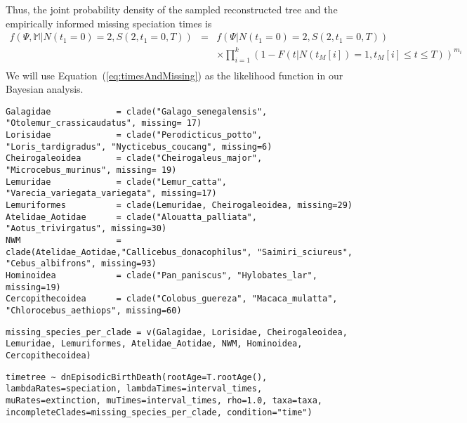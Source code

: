 Thus, the joint probability density of the sampled reconstructed tree and the empirically informed missing speciation times is
\begin{eqnarray}
f(\Psi,\mathbb{M}|N(t_1\!=\!0)\!=\!2,S(2,t_1\!=\!0,T))  & = & f(\Psi|N(t_1\!=\!0)\!=\!2,S(2,t_1\!=\!0,T)) \nonumber \\
& &  \times\prod_{i=1}^{k}\left(1-F(t|N(t_{M}[i])=1,t_{M}[i]\leq t \leq T)\right)^{m_i}  \nonumber\\ \label{eq:timesAndMissing}
\end{eqnarray}
We will use Equation~(\ref{eq:timesAndMissing}) as the likelihood function in our Bayesian analysis.


{\tt \begin{snugshade*}
\begin{lstlisting}
Galagidae             = clade("Galago_senegalensis",  "Otolemur_crassicaudatus", missing= 17)
Lorisidae             = clade("Perodicticus_potto", "Loris_tardigradus", "Nycticebus_coucang", missing=6)
Cheirogaleoidea       = clade("Cheirogaleus_major", "Microcebus_murinus", missing= 19)
Lemuridae             = clade("Lemur_catta", "Varecia_variegata_variegata", missing=17)
Lemuriformes          = clade(Lemuridae, Cheirogaleoidea, missing=29)
Atelidae_Aotidae      = clade("Alouatta_palliata", "Aotus_trivirgatus", missing=30)
NWM                   = clade(Atelidae_Aotidae,"Callicebus_donacophilus", "Saimiri_sciureus", "Cebus_albifrons", missing=93)
Hominoidea            = clade("Pan_paniscus", "Hylobates_lar", missing=19)
Cercopithecoidea      = clade("Colobus_guereza", "Macaca_mulatta", "Chlorocebus_aethiops", missing=60)
\end{lstlisting}
\end{snugshade*}}


{\tt \begin{snugshade*}
\begin{lstlisting}
missing_species_per_clade = v(Galagidae, Lorisidae, Cheirogaleoidea, Lemuridae, Lemuriformes, Atelidae_Aotidae, NWM, Hominoidea, Cercopithecoidea)
\end{lstlisting}
\end{snugshade*}}


{\tt \begin{snugshade*}
\begin{lstlisting}
timetree ~ dnEpisodicBirthDeath(rootAge=T.rootAge(), lambdaRates=speciation, lambdaTimes=interval_times, muRates=extinction, muTimes=interval_times, rho=1.0, taxa=taxa, incompleteClades=missing_species_per_clade, condition="time")
\end{lstlisting}
\end{snugshade*}}





